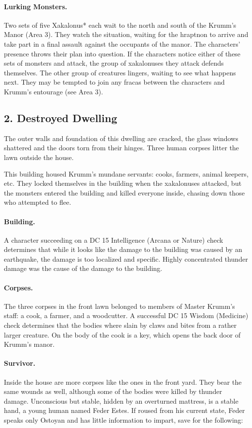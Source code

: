 \documentclass[10pt,a4paper,twoside,twocolumn,openany,bg=print,nodeprecatedcode]{dndbook}
\begin{document}
\paragraph{Lurking Monsters.}
Two sets of five Xakalonus* each wait to the north and south of the Krumm's Manor (Area 3). They watch the situation, waiting for the hraptnon to arrive and take part in a final assault against the occupants of the manor. The characters' presence throws their plan into question. If the characters notice either of these sets of monsters and attack, the group of xakalonuses they attack defends themselves.
The other group of creatures lingers, waiting to see what happens next. They may be tempted to join any fracas between the characters and Krumm's entourage (see Area 3).
\subsection{2. Destroyed Dwelling}
\begin{DndReadAloud}{}
The outer walls and foundation of this dwelling are cracked, the glass windows shattered and the doors torn from their hinges. Three human corpses litter the lawn outside the house.
\end{DndReadAloud}

This building housed Krumm's mundane servants: cooks, farmers, animal keepers, etc. They locked themselves in the building when the xakalonuses attacked, but the monsters entered the building and killed everyone inside, chasing down those who attempted to flee.
\paragraph{Building.}
A character succeeding on a DC 15 Intelligence (Arcana or Nature) check determines that while it looks like the damage to the building was caused by an earthquake, the damage is too localized and specific. Highly concentrated thunder damage was the cause of the damage to the building.
\paragraph{Corpses.}
The three corpses in the front lawn belonged to members of Master Krumm's staff: a cook, a farmer, and a woodcutter. A successful DC 15 Wisdom (Medicine) check determines that the bodies where slain by claws and bites from a rather larger creature. On the body of the cook is a key, which opens the back door of Krumm's manor.
\paragraph{Survivor.}
Inside the house are more corpses like the ones in the front yard. They bear the same wounds as well, although some of the bodies were killed by thunder damage. Unconscious but stable, hidden by an overturned mattress, is a stable hand, a young human named Feder Estes. If roused from his current state, Feder speaks only Ostoyan and has little information to impart, save for the following:
\end{document}
